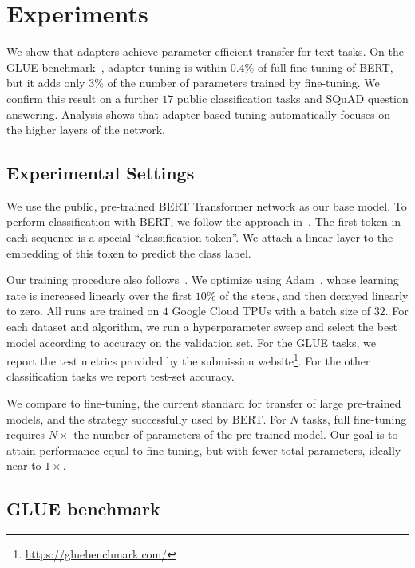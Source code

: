 \section{Experiments\label{sec:experiments}}

We show that adapters achieve parameter efficient transfer for text tasks.
On the GLUE benchmark~\citep{wang2018glue},
adapter tuning is within $0.4\%$ of full fine-tuning of BERT, but it adds only $3\%$ of the number of parameters trained by fine-tuning.
We confirm this result on a further $17$ public classification tasks and SQuAD question answering.
Analysis shows that adapter-based tuning automatically focuses on the higher layers of the network.

\subsection{Experimental Settings}

We use the public, pre-trained BERT Transformer network as our base model.
To perform classification with BERT, we follow the approach in~\citet{devlin2018bert}.
The first token in each sequence is a special ``classification token''.
We attach a linear layer to the embedding of this token to predict the class label.

Our training procedure also follows~\citet{devlin2018bert}.
We optimize using Adam~\citep{kingma2014adam},
whose learning rate is increased linearly over the first $10\%$ of the steps, and then decayed linearly to zero.
All runs are trained on $4$ Google Cloud TPUs with a batch size of $32$.
For each dataset and algorithm, we run a hyperparameter sweep and select the best model according to accuracy on the validation set.
For the GLUE tasks, we report the test metrics provided by the submission website\footnote{\url{https://gluebenchmark.com/}}.
For the other classification tasks we report test-set accuracy.

We compare to fine-tuning, the current standard for transfer of large pre-trained models,
and the strategy successfully used by BERT.
For $N$ tasks, full fine-tuning requires $N{\times}$ the number of parameters of the pre-trained model.
Our goal is to attain performance equal to fine-tuning, but with fewer total parameters, ideally near to $1{\times}$.

\subsection{GLUE benchmark\label{sec:glue}}

